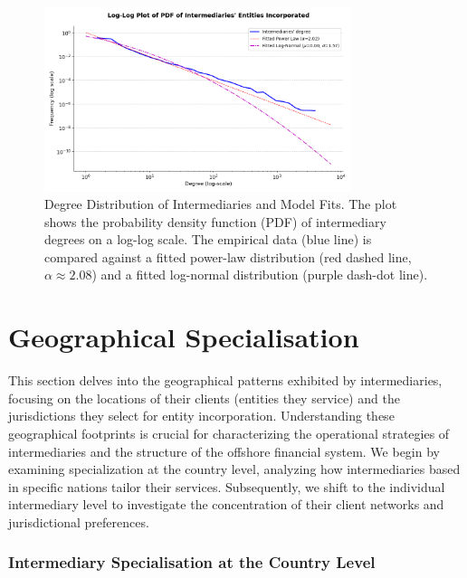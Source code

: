 \begin{figure}[htbp]
    \centering
    \includegraphics[width=0.8\textwidth]{images/Preliminary_Powerlaw_Fit.png} %
    \caption{Degree Distribution of Intermediaries and Model Fits. The plot shows the probability density function (PDF) of intermediary degrees on a log-log scale. The empirical data (blue line) is compared against a fitted power-law distribution (red dashed line, $\alpha \approx 2.08$) and a fitted log-normal distribution (purple dash-dot line).}
    \label{fig:preliminary_powerlaw_fit}
\end{figure}


\section{Geographical Specialisation}
\label{sec:geographical_specialisation}

This section delves into the geographical patterns exhibited by intermediaries, focusing on the locations of their clients (entities they service) and the jurisdictions they select for entity incorporation. Understanding these geographical footprints is crucial for characterizing the operational strategies of intermediaries and the structure of the offshore financial system. We begin by examining specialization at the country level, analyzing how intermediaries based in specific nations tailor their services. Subsequently, we shift to the individual intermediary level to investigate the concentration of their client networks and jurisdictional preferences.

\subsubsection{Intermediary Specialisation at the Country Level}
\label{subsubsec:intermediary_specialisation_country}

